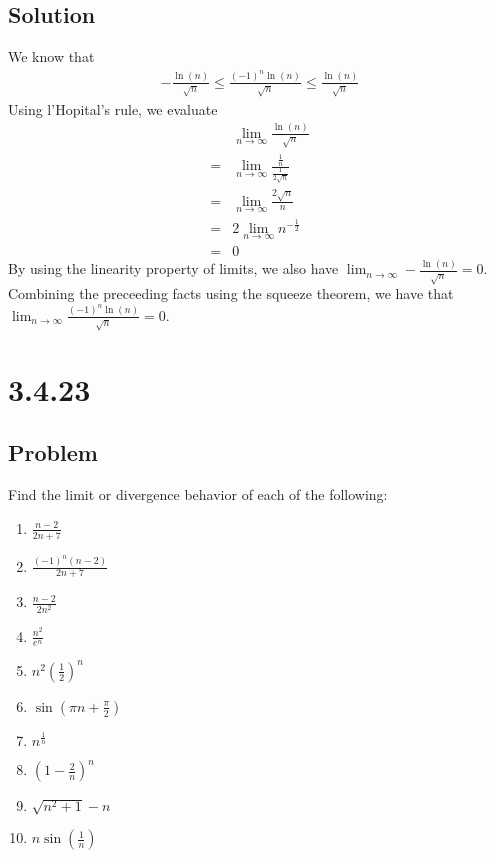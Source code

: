 \documentclass[12pt]{article}
\newcommand{\round}[1]{\left(       #1 \right)      }
\begin{document}
\subsection*{Solution}
We know that
\begin{align*}
    -\frac{\ln(n)}{\sqrt{n}} \leq \frac{(-1)^n \ln(n)}{\sqrt{n}} \leq \frac{\ln(n)}{\sqrt{n}}
\end{align*}
Using l'Hopital's rule, we evaluate
\begin{align*}
     & \lim_{n\to\infty} \frac{\ln(n)}{\sqrt{n}} \\
    =& \lim_{n\to\infty} \frac{\frac{1}{n}}{\frac{1}{2\sqrt{n}}} \\
    =& \lim_{n\to\infty} \frac{2\sqrt{n}}{n} \\
    =& 2 \lim_{n\to\infty} n^{-\frac{1}{2}} \\
    =& 0
\end{align*}
By using the linearity property of limits, we also have $\lim_{n\to\infty} -\frac{\ln(n)}{\sqrt{n}} = 0$. Combining the preceeding facts using the squeeze theorem, we have that $\lim_{n\to\infty} \frac{(-1)^n \ln(n)}{\sqrt{n}} = 0$.



\section*{3.4.23}

\subsection*{Problem}
Find the limit or divergence behavior of each of the following:
\begin{enumerate}
    \item $\frac{n - 2}{2n + 7}$
    \item $\frac{(-1)^n (n - 2)}{2n + 7}$
    \item $\frac{n - 2}{2n^2}$
    \item $\frac{n^2}{e^n}$
    \item $n^2 \round{\frac{1}{2}}^n$
    \item $\sin(\pi n + \frac{\pi}{2})$
    \item $n^\frac{1}{n}$
    \item $\round{1 - \frac{2}{n}}^n$
    \item $\sqrt{n^2 + 1} - n$
    \item $n \sin\round{\frac{1}{n}}$
\end{enumerate}
\end{document}
